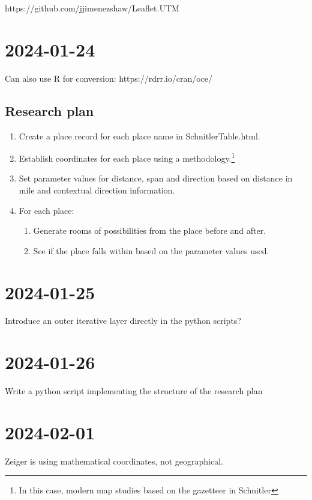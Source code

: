 \documentclass[12pt]{book}
\begin{document}
https://github.com/jjimenezshaw/Leaflet.UTM

\section{2024-01-24}

Can also use R for conversion: https://rdrr.io/cran/oce/

\subsection{Research plan}

\begin{enumerate}
\item Create a place record for each place name in SchnitlerTable.html.
\item Establish coordinates for each place using a methodology.\footnote{In this case, modern map studies based on the gazetteer in Schnitler}
\item Set parameter values for distance, span and direction based on distance in mile and contextual direction information.
\item For each place:
\begin{enumerate}
\item Generate rooms of possibilities from the place before and after.
\item See if the place falls within based on the parameter values used. 
\end{enumerate}
\end{enumerate}

\section{2024-01-25}

Introduce an outer iterative layer directly in the python scripts?

\section{2024-01-26}

Write a python script implementing the structure of the research plan

\section{2024-02-01}

Zeiger is using mathematical coordinates, not geographical.
\end{document}
